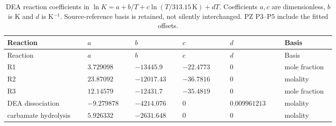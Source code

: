 \begingroup\small\setlength{\tabcolsep}{3pt}
\begin{longtable}{@{}>{\raggedright\arraybackslash}p{0.22\linewidth}>{\raggedright\arraybackslash}p{0.13\linewidth}>{\raggedright\arraybackslash}p{0.13\linewidth}>{\raggedright\arraybackslash}p{0.13\linewidth}>{\raggedright\arraybackslash}p{0.15\linewidth}>{\raggedright\arraybackslash}p{0.14\linewidth}@{}}
\caption{DEA reaction coefficients in $\ln K=a+b/T+c\ln(T/313.15\,\mathrm K)+dT$. Coefficients $a,c$ are dimensionless, $b$ is K and $d$ is K$^{-1}$. Source-reference basis is retained, not silently interchanged. PZ P3--P5 include the fitted offsets.}\label{tab:p2-dea-laws}\\
\toprule Reaction & $a$ & $b$ & $c$ & $d$ & Basis \\ \midrule\endfirsthead
\toprule Reaction & $a$ & $b$ & $c$ & $d$ & Basis \\ \midrule\endhead
\bottomrule\endfoot
R1 & $3.729098$ & $-13445.9$ & $-22.4773$ & $0$ & mole fraction \\
R2 & $23.87092$ & $-12017.43$ & $-36.7816$ & $0$ & molality \\
R3 & $12.14579$ & $-12431.7$ & $-35.4819$ & $0$ & mole fraction \\
DEA dissociation & $-9.279878$ & $-4214.076$ & $0$ & $0.009961213$ & molality \\
carbamate hydrolysis & $5.926332$ & $-2631.648$ & $0$ & $0$ & molality \\
\end{longtable}\endgroup
